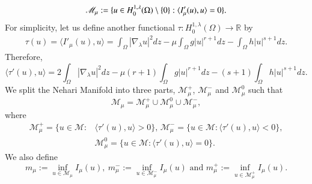 \documentclass[12pt, notitlepage]{article}
\def\R{\mathbb{R}}
\begin{document}
{\begin{align}\label{N1}
    \mathscr{M}_\mu:=\{ u\in H^{1,\lambda}_0(\Omega)\setminus\textcolor{black}{\{0\}}: \langle I'_\mu(u),u\rangle=0 \}.
\end{align}
 For simplicity, let us define another functional $\tau: H^{1,\lambda}_0(\Omega)\to \R$ by
\begin{align}\label{N2}
    \tau(u)=\langle I'_\mu(u),u \rangle=\int_\Omega |\nabla_\lambda u|^2 dz-\mu\int_\Omega g|u|^{r+1} dz-\int_\Omega h|u|^{s+1} dz.
\end{align}
Therefore, $$\langle \tau'(u),u\rangle=2\int_\Omega |\nabla_\lambda u|^2 dz-\mu(r+1)\int_\Omega g|u|^{r+1} dz-(s+1)\int_\Omega h|u|^{s+1} dz.$$
We split the Nehari Manifold into three parts, $\mathscr{M}_\mu^+$, $\mathscr{M}_\mu^-$ and $\mathscr{M}_\mu^0$ such that 
$$\mathscr{M}_\mu=\mathscr{M}_\mu^+\cup\mathscr{M}_\mu^0\cup\mathscr{M}_\mu^-,$$
 where 
 \begin{align*}
     \mathscr{M}^+_\mu=\{ u\in\mathscr{M}: &\langle \tau'(u),u\rangle>0\},\, \mathscr{M}^-_\mu=\{ u\in\mathscr{M}: \langle \tau'(u),u\rangle<0\},\\
     &\mathscr{M}^0_\mu=\{ u\in\mathscr{M}: \langle \tau'(u),u\rangle=0\}.
 \end{align*}
We also define $$m_\mu:=\inf_{u\in\mathscr{M}_\mu} I_\mu(u),\ m^-_\mu:=\inf_{u\in\mathscr{M}^-_\mu}  I_\mu(u)\text{ and } m^+_\mu:=\inf_{u\in\mathscr{M}^+_\mu} I_\mu(u).$$
 
}
\end{document}
